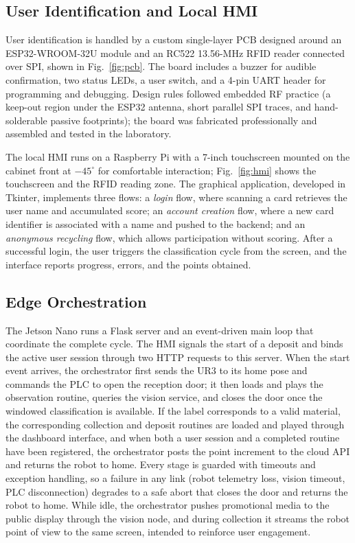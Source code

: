 ﻿\documentclass[conference]{IEEEtran}
\begin{document}
\subsection{User Identification and Local HMI}
User identification is handled by a custom single-layer PCB designed around an ESP32-WROOM-32U module and an RC522 13.56-MHz RFID reader connected over SPI, shown in Fig.~\ref{fig:pcb}. The board includes a buzzer for audible confirmation, two status LEDs, a user switch, and a 4-pin UART header for programming and debugging. Design rules followed embedded RF practice (a keep-out region under the ESP32 antenna, short parallel SPI traces, and hand-solderable passive footprints); the board was fabricated professionally and assembled and tested in the laboratory.

The local HMI runs on a Raspberry Pi with a 7-inch touchscreen mounted on the cabinet front at $-45^{\circ}$ for comfortable interaction; Fig.~\ref{fig:hmi} shows the touchscreen and the RFID reading zone. The graphical application, developed in Tkinter, implements three flows: a \emph{login} flow, where scanning a card retrieves the user name and accumulated score; an \emph{account creation} flow, where a new card identifier is associated with a name and pushed to the backend; and an \emph{anonymous recycling} flow, which allows participation without scoring. After a successful login, the user triggers the classification cycle from the screen, and the interface reports progress, errors, and the points obtained.

\subsection{Edge Orchestration}
The Jetson Nano runs a Flask server and an event-driven main loop that coordinate the complete cycle. The HMI signals the start of a deposit and binds the active user session through two HTTP requests to this server. When the start event arrives, the orchestrator first sends the UR3 to its home pose and commands the PLC to open the reception door; it then loads and plays the observation routine, queries the vision service, and closes the door once the windowed classification is available. If the label corresponds to a valid material, the corresponding collection and deposit routines are loaded and played through the dashboard interface, and when both a user session and a completed routine have been registered, the orchestrator posts the point increment to the cloud API and returns the robot to home. Every stage is guarded with timeouts and exception handling, so a failure in any link (robot telemetry loss, vision timeout, PLC disconnection) degrades to a safe abort that closes the door and returns the robot to home. While idle, the orchestrator pushes promotional media to the public display through the vision node, and during collection it streams the robot point of view to the same screen, intended to reinforce user engagement.
\end{document}
